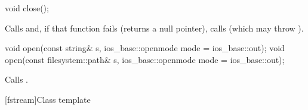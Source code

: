 %
\begin{itemdecl}
void close();
\end{itemdecl}

\begin{itemdescr}
\pnum
\effects
Calls
and, if that function fails (returns a null pointer), calls
(which may throw
).
\end{itemdescr}

%
\begin{itemdecl}
void open(const string& s, ios_base::openmode mode = ios_base::out);
void open(const filesystem::path& s, ios_base::openmode mode = ios_base::out);
\end{itemdecl}

\begin{itemdescr}
\pnum
\effects
Calls .
\end{itemdescr}

[fstream]{Class template }

